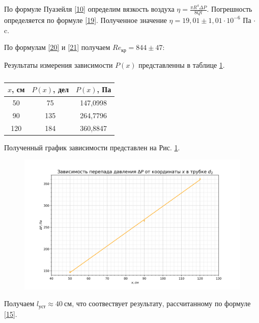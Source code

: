 \documentclass[a4paper, 12pt]{article}
\begin{document}
\newpage
\par По формуле Пуазейля \eqref{10} определим вязкость воздуха $\eta = \frac{\pi R^4\Delta{P}}{8Ql}$. Погрешность определяется по формуле \eqref{19}.
Полученное значение $\eta = 19,01\pm1,01\cdot10^{-6}$ Па $\cdot$ c.
\par По формулам \eqref{20} и \eqref{21} получаем $Re_{\text{кр}} = 844\pm47$:
\par Результаты измерения зависимости $P(x)$ представленны в таблице \ref{tab6}.
\begin{table}[h!]
\begin{center}
\begin{tabular}{|c|c|c|}
\hline
$x$, см & $P(x)$, дел & $P(x)$, Па \\ \hline
50    & 75        & 147,0998 \\ \hline
90    & 135       & 264,7796 \\ \hline
120   & 184       & 360,8847 \\ \hline
\end{tabular}
\caption{}
\label{tab6}
\end{center}
\end{table}
Полученный график зависимости представлен на Рис. \ref{ris9}.
\begin{figure}[h!]
\begin{flushleft}
    \includegraphics[scale=0.75]{1.3.3_4.png}
\end{flushleft}
\caption{}
\label{ris9}
\end{figure}
Получаем $l_{\text{уст}} \approx 40~\text{см}$, что соотвествует результату, рассчитанному по формуле \eqref{15}.\\[6cm]
\end{document}
